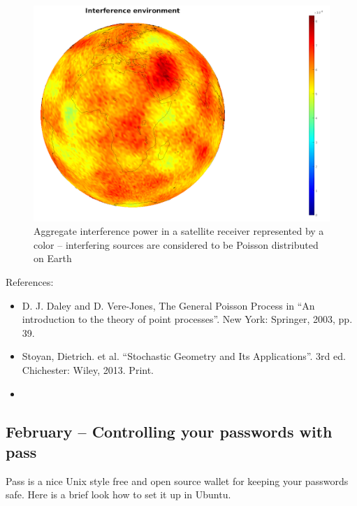\documentclass{article}
\begin{document}
\begin{figure}
  \includegraphics[width=\linewidth]{interferenceenvironment.png}
  \caption{Aggregate interference power in a satellite receiver represented by a color – interfering sources are considered to be Poisson distributed on Earth}
\end{figure}

References:
\begin{itemize}
\item D. J. Daley and D. Vere-Jones, The General Poisson Process in  ``An introduction to the theory of point processes''. New York: Springer, 2003, pp. 39. 
\item Stoyan, Dietrich. et al. ``Stochastic Geometry and Its Applications''. 3rd ed. Chichester: Wiley, 2013. Print.
\item  {}
\end{itemize}




\subsection{February – Controlling your passwords with pass}
Pass is a nice Unix style free and open source wallet for keeping your passwords safe. Here is a brief look how to set it up in Ubuntu.
\end{document}
